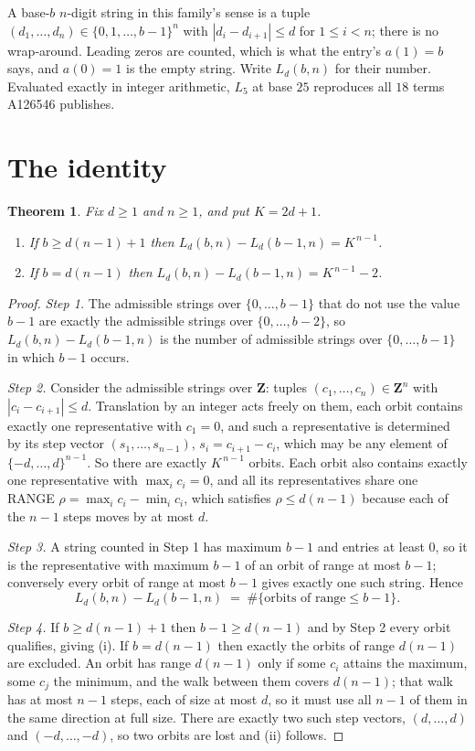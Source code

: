 \documentclass[11pt,a4paper]{article}
\theoremstyle{plain}
\newtheorem{theorem}{Theorem}
\theoremstyle{definition}
\begin{document}
A base-$b$ $n$-digit string in this family's sense is a tuple
$(d_1,\dots,d_n)\in\{0,1,\dots,b-1\}^{n}$ with $|d_i-d_{i+1}|\le d$ for $1\le i<n$; there
is no wrap-around. Leading zeros are counted, which is what the entry's $a(1)=b$ says, and
$a(0)=1$ is the empty string. Write $L_d(b,n)$ for their number. Evaluated exactly in integer
arithmetic, $L_{5}$ at base $25$ reproduces all $18$ terms A126546 publishes.

\section{The identity}

\begin{theorem}
Fix $d\ge1$ and $n\ge1$, and put $K=2d+1$.
\begin{enumerate}
\item[(i)] If $b\ge d(n-1)+1$ then $L_d(b,n)-L_d(b-1,n)=K^{\,n-1}$.
\item[(ii)] If $b=d(n-1)$ then $L_d(b,n)-L_d(b-1,n)=K^{\,n-1}-2$.
\end{enumerate}
\end{theorem}

\begin{proof}
\emph{Step 1.} The admissible strings over $\{0,\dots,b-1\}$ that do not use the value $b-1$
are exactly the admissible strings over $\{0,\dots,b-2\}$, so $L_d(b,n)-L_d(b-1,n)$ is the
number of admissible strings over $\{0,\dots,b-1\}$ in which $b-1$ occurs.

\emph{Step 2.} Consider the admissible strings over $\mathbf{Z}$: tuples
$(c_1,\dots,c_n)\in\mathbf{Z}^{n}$ with $|c_i-c_{i+1}|\le d$. Translation by an integer acts
freely on them, each orbit contains exactly one representative with $c_1=0$, and such a
representative is determined by its step vector $(s_1,\dots,s_{n-1})$, $s_i=c_{i+1}-c_i$,
which may be any element of $\{-d,\dots,d\}^{n-1}$. So there are exactly $K^{\,n-1}$ orbits.
Each orbit also contains exactly one representative with $\max_i c_i=0$, and all its
representatives share one RANGE $\rho=\max_ic_i-\min_ic_i$, which satisfies
$\rho\le d(n-1)$ because each of the $n-1$ steps moves by at most $d$.

\emph{Step 3.} A string counted in Step 1 has maximum $b-1$ and entries at least $0$, so it is
the representative with maximum $b-1$ of an orbit of range at most $b-1$; conversely every orbit
of range at most $b-1$ gives exactly one such string. Hence
\[
L_d(b,n)-L_d(b-1,n)\;=\;\#\{\text{orbits of range}\le b-1\} .
\]

\emph{Step 4.} If $b\ge d(n-1)+1$ then $b-1\ge d(n-1)$ and by Step 2 every orbit qualifies,
giving (i). If $b=d(n-1)$ then exactly the orbits of range $d(n-1)$ are excluded. An orbit has
range $d(n-1)$ only if some $c_i$ attains the maximum, some $c_j$ the minimum, and the walk
between them covers $d(n-1)$; that walk has at most $n-1$ steps, each of size at most $d$, so it
must use all $n-1$ of them in the same direction at full size. There are exactly two such step
vectors, $(d,\dots,d)$ and $(-d,\dots,-d)$, so two orbits are lost and (ii) follows.
\end{proof}
\end{document}

